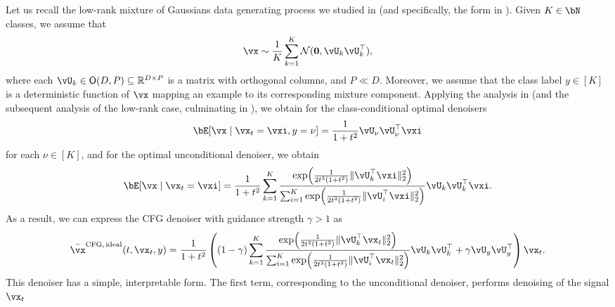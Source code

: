 \documentclass[../../book-main.tex]{subfiles}
\begin{document}
\begin{example}\label{example:denoising-gaussian-mixture-cfg}
  Let us recall the low-rank mixture of Gaussians data generating process we studied in
   (and specifically, the form in
  ). Given $K \in \bN$ classes, we assume that
  \begin{equation}\label{eq:MoG1-ch6}
    \vx \sim \frac{1}{K}\sum_{k = 1}^{K}\dNorm(\vzero, \vU_{k}\vU_{k}^{\top}),
  \end{equation}
  where each \(\vU_{k} \in \O(D, P) \subseteq \R^{D \times P}\) is a matrix with
  orthogonal columns, and $P \ll D$.
  Moreover, we assume that the class label $y \in [K]$ is a deterministic
  function of $\vx$ mapping an example to its corresponding mixture component.
  Applying the analysis in  (and the
  subsequent analysis of the low-rank case, culminating in
  ), we obtain for the class-conditional optimal
  denoisers
  \begin{equation}\label{eq:gmm_lowrank_denoiser-ch6-classcond}
    \bE[ \vx \mid \vx_t = \vxi, y = \nu ]
    = \frac{1}{1 + t^{2}}
    \vU_{\nu}\vU_{\nu}^{\top}\vxi
  \end{equation}
  for each $\nu \in [K]$, and for the optimal unconditional denoiser, we obtain
  \begin{equation}\label{eq:gmm_lowrank_denoiser-ch6-uncond}
    \bE[ \vx \mid \vx_t = \vxi ]
    = \frac{1}{1 + t^{2}}\sum_{k = 1}^{K}\frac{\exp\rp{\frac{1}{2t^{2}(1 + t^{2})}\norm{\vU_{k}^{\top}\vxi}_{2}^{2}}}{\sum_{i = 1}^{K}\exp\rp{\frac{1}{2t^{2}(1 + t^{2})}\norm{\vU_{i}^{\top}\vxi}_{2}^{2}}}\vU_{k}\vU_{k}^{\top}\vxi.
  \end{equation}
  As a result, we can express the CFG denoiser with guidance strength $\gamma
  > 1$ as
  \begin{equation}\label{eq:cfg-denoiser-mog-low-rank}
    \bar{\vx}^{\mathrm{CFG,\,ideal}}(t, \vx_t, y)
    =
    \frac{1}{1 + t^{2}}
    \left(
    (1 - \gamma) 
    \sum_{k = 1}^{K}\frac{\exp\rp{\frac{1}{2t^{2}(1
    + t^{2})}\norm{\vU_{k}^{\top}\vx_t}_{2}^{2}}}{\sum_{i
    = 1}^{K}\exp\rp{\frac{1}{2t^{2}(1
    + t^{2})}\norm{\vU_{i}^{\top}\vx_t}_{2}^{2}}}\vU_{k}\vU_{k}^{\top}
    +
    \gamma 
    \vU_{y}\vU_{y}^{\top}
    \right)
    \vx_t.
  \end{equation}
  This denoiser has a simple, interpretable form. The first term, corresponding
  to the unconditional denoiser, performs denoising of the signal $\vx_t$

\end{example}
\end{document}
